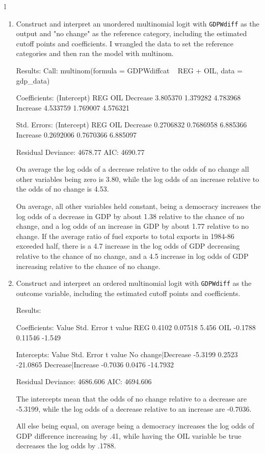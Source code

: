 l\documentclass[12pt,letterpaper]{article}
\begin{document}
\begin{enumerate}
	\item Construct and interpret an unordered multinomial logit with \texttt{GDPWdiff} as the output and "no change" as the reference category, including the estimated cutoff points and coefficients.
	I wrangled the data to set the reference categories and then ran the model with multinom. 
	
	
	Results: 
	Call:
	multinom(formula = GDPWdiffcat ~ REG + OIL, data = gdp_data)
	
	Coefficients:
						(Intercept)      REG      OIL
	Decrease    3.805370 1.379282 4.783968
	Increase    4.533759 1.769007 4.576321
	
	Std. Errors:
						(Intercept)       REG      OIL
	Decrease   0.2706832 0.7686958 6.885366
	Increase   0.2692006 0.7670366 6.885097
	
	Residual Deviance: 4678.77 
	AIC: 4690.77 
	
	On average the log odds of a decrease relative to the odds of no change all other variables being zero is 3.80, while the log odds of an increase relative to the odds of no change is 4.53.
	
	On average, all other variables held constant, being a democracy increases the log odds of a decrease in GDP by about 1.38 relative to the chance of no change, and a log odds of an increase in GDP by about 1.77 relative to no change. If the average ratio of fuel exports to total exports in 1984-86 exceeded half, there is a 4.7 increase in the log odds of GDP decreasing relative to the chance of no change, and a 4.5 increase in log odds of GDP increasing relative to the chance of no change.
	
	\item Construct and interpret an ordered multinomial logit with \texttt{GDPWdiff} as the outcome variable, including the estimated cutoff points and coefficients.
	
	Results: 
	
	Coefficients:
				Value Std. Error t value
	REG  0.4102    0.07518   5.456
	OIL -0.1788    0.11546  -1.549
	
	Intercepts:
											Value    Std. Error t value 
	No change|Decrease  -5.3199   0.2523   -21.0865
	Decrease|Increase   -0.7036   0.0476   -14.7932
	
	Residual Deviance: 4686.606 
	AIC: 4694.606 
	
The intercepts mean that the odds of no change relative to a decrease are -5.3199, while the log odds of a decrease relative to an increase are -0.7036.
	
All else being equal, on average being a democracy increases the log odds of GDP difference increasing by .41, while having the OIL variable be true decreases the log odds by .1788.
	
\end{enumerate}
\end{document}
